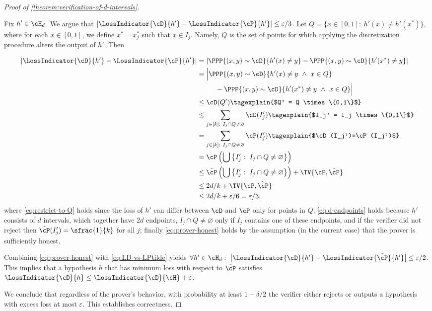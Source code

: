 \begin{proof}[Proof of \cref{theorem:verification-of-d-intervals}]
\begin{itemize}
{			Fix $h' \in \cH_d$. We argue that $\left|\LossIndicator{\cD}{h'} - \LossIndicator{\cP}{h'}\right| \leq \varepsilon/3$. 
			Let $Q = \{x \in [0,1]: ~ h'(x) \neq h'(x^*) \}$, where for each $x \in [0,1]$, we define $x^* = x_j^*$ such that $x \in I_j$. Namely, $Q$ is the set of points for which applying the discretization procedure alters the output of $h'$. Then

			\begingroup
			\allowdisplaybreaks
			\begin{align}
				\left|\LossIndicator{\cD}{h'}-\LossIndicator{\cP}{h'}\right| &= \left|\PPP{(x,y) \sim \cD}{h'(x) \neq y}-\PPP{(x,y) \sim \cD}{h'(x^*) \neq y}\right| \nonumber\\
				&= \Big|\PPP{(x,y) \sim \cD}{h'(x) \neq y ~ \land ~ x \in Q} \nonumber\\
				& ~~~~~~~~ -\PPP{(x,y) \sim \cD}{h'(x^*) \neq y  ~ \land ~ x \in Q}\Big| \label{eq:restrict-to-Q}\\
				&\leq \cD(Q') \tagexplain{$Q' = Q \times \{0,1\}$}\nonumber\\
				&\leq \sum_{j \in [k]: ~ I_j \cap Q \neq \varnothing} \cD(I_j') \tagexplain{$I_j' = I_j \times \{0,1\}$} \nonumber\\
				&= \sum_{j \in [k]: ~ I_j \cap Q \neq \varnothing} \cP(I_j') \tagexplain{$\cD(I_j')=\cP(I_j')$}\nonumber\\
				&=\cP\left(\bigcup\left\{I_j': ~ I_j \cap Q \neq \varnothing\right\}\right) \nonumber\\
				&\leq \tilde{\cP}\left(\bigcup\left\{I_j': ~ I_j \cap Q \neq \varnothing\right\}\right) + \TV{\cP,\tilde{\cP}} \nonumber\\
				&\leq 2d/k + \TV{\cP,\tilde{\cP}} \label{eq:d-endpoints}\\
				&\leq 2d/k + \varepsilon/6 = \varepsilon/3, \label{eq:prover-honest}
			\end{align}%
			\endgroup
			where \cref{eq:restrict-to-Q} holds since the loss of $h'$ can differ between $\cD$ and $\cP$ only for points in $Q$; \cref{eq:d-endpoints} holds because $h'$ consists of $d$ intervals, which together have $2d$ endpoints, $I_j \cap Q \neq \varnothing$ only if $I_j$ contains one of these endpoints, and if the verifier did not reject then $\tilde{\cP}(I_j') = \sfrac{1}{k}$ for all $j$; finally \cref{eq:prover-honest} holds by the assumption (in the current case) that the prover is sufficiently honest.

			Combining \cref{eq:prover-honest} with \cref{eq:LD-vs-LPtilde} yields $\forall h' \in \cH_d: ~ \left|\LossIndicator{\cD}{h'} - \LossIndicator{\tilde{\cP}}{h'}\right| \leq \varepsilon/2$. This implies that a hypothesis $h$ that has minimum loss with respect to $\tilde{\cP}$ satisfies $\LossIndicator{\cD}{h} \leq \LossIndicator{\cD}{\cH} + \varepsilon$. 
		}
	\end{itemize}
	We conclude that regardless of the prover's behavior, with probability at least $1-\delta/2$ the verifier either rejects or outputs a hypothesis with excess loss at most $\varepsilon$. This establishes correctness.


\end{proof}
